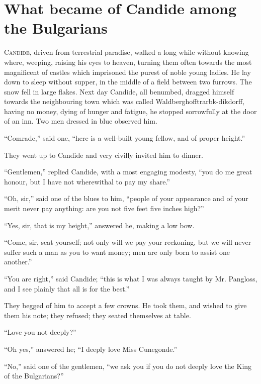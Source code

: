 \vspace{1cm}
\begingroup
\let\clearpage\relax
\chapter{What became of Candide among the Bulgarians}
\thispagestyle{pter}
\endgroup
\vspace{-1cm}
\lettrine[lraise=0.1,nindent=0em,slope=-.5em]{ C}{andide}, driven from terrestrial paradise, walked a long while without knowing where, weeping, raising his eyes to heaven, turning them often towards the most magnificent of castles which imprisoned the purest of noble young ladies. He lay down to sleep without supper, in the middle of a field between two furrows. The snow fell in large flakes. Next day Candide, all benumbed, dragged himself towards the neighbouring town which was called Waldberghofftrarbk-dikdorff, having no money, dying of hunger and fatigue, he stopped sorrowfully at the door of an inn. Two men dressed in blue observed him.

``Comrade,'' said one, ``here is a well-built young fellow, and of proper height.''

They went up to Candide and very civilly invited him to dinner.

``Gentlemen,'' replied Candide, with a most engaging modesty, ``you do me great honour, but I have not wherewithal to pay my share.''

``Oh, sir,'' said one of the blues to him, ``people of your appearance and of your merit never pay anything: are you not five feet five inches high?''

``Yes, sir, that is my height,'' answered he, making a low bow.

``Come, sir, seat yourself; not only will we pay your reckoning, but we will never suffer such a man as you to want money; men are only born to assist one another.''

``You are right,'' said Candide; ``this is what I was always taught by Mr. Pangloss, and I see plainly that all is for the best.''

They begged of him to accept a few crowns. He took them, and wished to give them his note; they refused; they seated themselves at table.

``Love you not deeply?''

``Oh yes,'' answered he; ``I deeply love Miss Cunegonde.''

``No,'' said one of the gentlemen, ``we ask you if you do not deeply love the King of the Bulgarians?''

